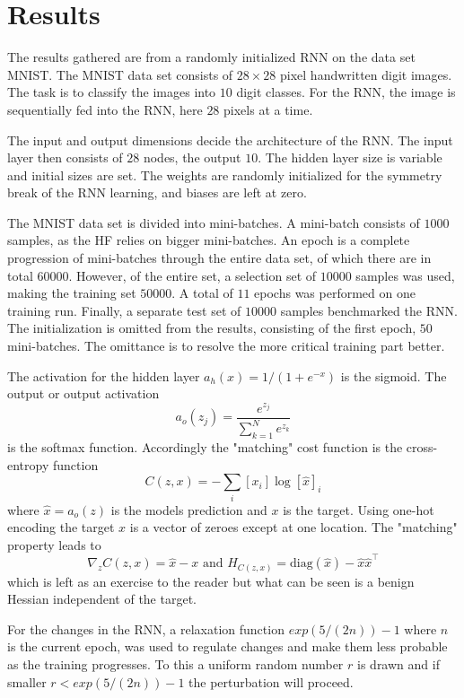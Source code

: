 \chapter{Results}

The results gathered are from a randomly initialized RNN on the data set MNIST. The MNIST data set consists of $28 \times 28$ pixel handwritten digit images. The task is to classify the images into $10$ digit classes. For the RNN, the image is sequentially fed into the RNN, here $28$ pixels at a time. 

The input and output dimensions decide the architecture of the RNN. The input layer then consists of $28$ nodes, the output $10$. The hidden layer size is variable and initial sizes are set. The weights are randomly initialized for the symmetry break of the RNN learning, and biases are left at zero. 

The MNIST data set is divided into mini-batches. A mini-batch consists of $1000$ samples, as the HF relies on bigger mini-batches. An epoch is a complete progression of mini-batches through the entire data set, of which there are in total $60 000$. However, of the entire set, a selection set of $10 000$ samples was used, making the training set $50000$. A total of $11$ epochs was performed on one training run. Finally, a separate test set of $10000$ samples benchmarked the RNN. The initialization is omitted from the results, consisting of the first epoch, $50$ mini-batches. The omittance is to resolve the more critical training part better.

The activation for the hidden layer $a_h(x) = 1/(1 + e^{-x})$ is the sigmoid. The output or output activation \[a_o(z_j) = \frac{e^{z_j}}{\sum_{k=1}^N e^{z_k}}\] is the softmax function. Accordingly the "matching" cost function is the cross-entropy function \[C(z,x) = - \sum_i [x_i] \log [\hat{x}]_i\] where $\hat{x} = a_o(z)$ is the models prediction and $x$ is the target. Using one-hot encoding the target $x$ is a vector of zeroes except at one location. The "matching" property leads to \[\nabla_z C(z,x) = \hat{x} - x \text{ and } H_{C(z,x)} = \text{diag}(\hat{x}) - \hat{x} \hat{x}^\top\] which is left as an exercise to the reader but what can be seen is a benign Hessian independent of the target. 

For the changes in the RNN, a relaxation function $exp(5/(2n)) - 1$ where $n$ is the current epoch, was used to regulate changes and make them less probable as the training progresses. To this a uniform random number $r$ is drawn and if smaller $ r < exp(5/(2n)) - 1$ the perturbation will proceed.

